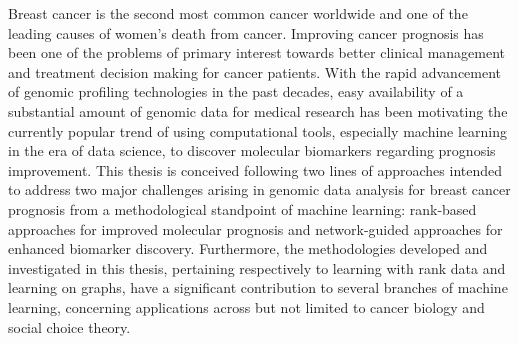 Breast cancer is the second most common cancer worldwide and one of the leading causes of women's death from cancer. Improving cancer prognosis has been one of the problems of primary interest towards better clinical management and treatment decision making for cancer patients. With the rapid advancement of genomic profiling technologies in the past decades, easy availability of a substantial amount of genomic data for medical research has been motivating the currently popular trend of using computational tools, especially machine learning in the era of data science, to discover molecular biomarkers regarding prognosis improvement. This thesis is conceived following two lines of approaches intended to address two major challenges arising in genomic data analysis for breast cancer prognosis from a methodological standpoint of machine learning: rank-based approaches for improved molecular prognosis and network-guided approaches for enhanced biomarker discovery. Furthermore, the methodologies developed and investigated in this thesis, pertaining respectively to learning with rank data and learning on graphs, have a significant contribution to several branches of machine learning, concerning applications across but not limited to cancer biology and social choice theory.
